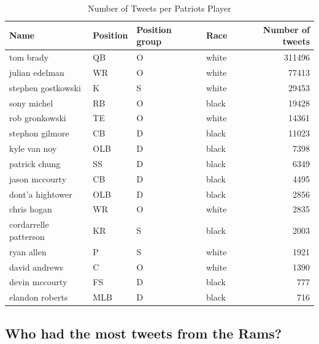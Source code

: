 \documentclass[12pt,twoside]{reedthesis}
\begin{document}
\small
\begin{table}[!h]

\caption[Number of Tweets per Patriots Player]{\label{tab:tweetspatst}Number of Tweets per Patriots Player}
\centering
\begin{tabular}{l|l|l|l|r}
\hline
Name & Position & Position group & Race & Number of tweets\\
\hline
tom brady & QB & O & white & 311496\\
\hline
julian edelman & WR & O & white & 77413\\
\hline
stephen gostkowski & K & S & white & 29453\\
\hline
sony michel & RB & O & black & 19428\\
\hline
rob gronkowski & TE & O & white & 14361\\
\hline
stephon gilmore & CB & D & black & 11023\\
\hline
kyle van noy & OLB & D & black & 7398\\
\hline
patrick chung & SS & D & black & 6349\\
\hline
jason mccourty & CB & D & black & 4495\\
\hline
dont'a hightower & OLB & D & black & 2856\\
\hline
chris hogan & WR & O & white & 2835\\
\hline
cordarrelle patterson & KR & S & black & 2003\\
\hline
ryan allen & P & S & white & 1921\\
\hline
david andrews & C & O & white & 1390\\
\hline
devin mccourty & FS & D & black & 777\\
\hline
elandon roberts & MLB & D & black & 716\\
\hline
\end{tabular}
\end{table}
\normalsize

\subsection{Who had the most tweets from the
Rams?}\label{who-had-the-most-tweets-from-the-rams}
\end{document}
